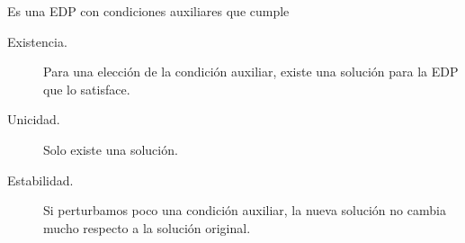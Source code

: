 \begin{definition}
	Es una EDP con condiciones auxiliares que cumple
	\begin{description}
		\item[Existencia.]

		      Para una elección de la condición auxiliar, existe
		      una solución para la EDP que lo satisface.

		\item[Unicidad.]

		      Solo existe una solución.

		\item[Estabilidad.]

		      Si perturbamos poco una condición auxiliar, la nueva
		      solución no cambia mucho respecto a la solución original.
	\end{description}
\end{definition}

